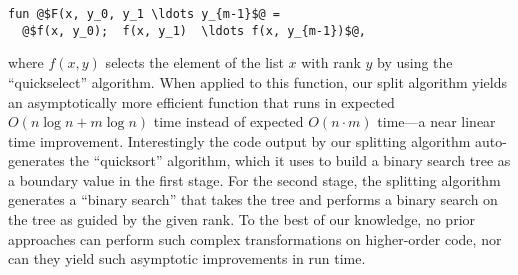 \begin{lstlisting}
fun @$F(x, y_0, y_1 \ldots y_{m-1}$@ = 
  @$f(x, y_0);  f(x, y_1)  \ldots f(x, y_{m-1})$@,
\end{lstlisting}
where $f(x,y)$ selects the element of the list $x$ with rank $y$ by
using the ``quickselect'' algorithm.  When applied to this function,
our split algorithm yields an asymptotically more efficient function
that runs in expected $O(n\log{n} + m\log{n})$ time instead of
expected $O(n \cdot m)$ time---a near linear time improvement.
Interestingly the code output by our splitting algorithm
auto-generates the ``quicksort'' algorithm, which it uses to build a
binary search tree as a boundary value in the first stage.  For the
second stage, the splitting algorithm generates a ``binary search''
that takes the tree and performs a binary search on the tree as guided
by the given rank.  To the best of our knowledge, no prior approaches
can perform such complex transformations on higher-order code, nor can
they yield such asymptotic improvements in run time.

